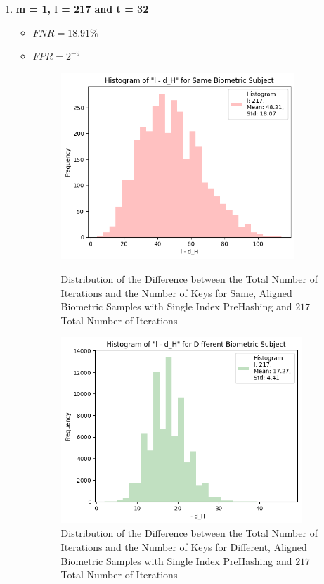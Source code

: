 \begin{enumerate}
    \item \textbf{m = 1, l = 217 and t = 32}
        \begin{itemize}
            \item $FNR = 18.91\%$
            \item $FPR = 2^{-9}$

            \begin{figure}[H]
                \centering
                \begin{minipage}[b]{0.48\linewidth}
                    \centering
                    \includegraphics[width=\linewidth,height=7cm,keepaspectratio]{latex-img/l-dHconfig1a_same.png}
                    \caption{Distribution of the Difference between the Total Number of Iterations and the Number of Keys for Same, Aligned Biometric Samples with Single Index PreHashing and $217$ Total Number of Iterations}
                    \label{l-dHconfig1a_same}
                \end{minipage}
                \hfill
                \begin{minipage}[b]{0.48\linewidth}
                    \centering
                    \includegraphics[width=\linewidth,height=7cm,keepaspectratio]{latex-img/l-dHconfig1a_diff.png}
                    \caption{Distribution of the Difference between the Total Number of Iterations and the Number of Keys for Different, Aligned Biometric Samples with Single Index PreHashing and $217$ Total Number of Iterations}
                    \label{l-dHconfig1a_diff}
                \end{minipage}
            \end{figure}
            

\end{itemize}
\end{enumerate}
